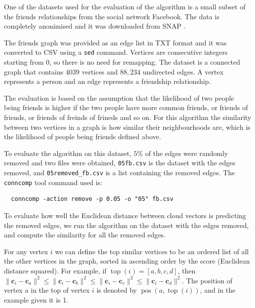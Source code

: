 \documentclass[12pt]{report}
\DeclareMathOperator{\ttop}{top}
\DeclareMathOperator{\pos}{pos}
\begin{document}
One of the datasets used for the evaluation of the algorithm is a small subset
of the friends relationships from the social network Facebook. The data is
completely anonimised and it was downloaded from SNAP \cite{snapnets}.


The friends graph was provided as an edge list in TXT format and it was converted
to CSV using a {\tt sed} command. Vertices are consecutive integers starting
from 0, so there is no need for remapping. The dataset is a connected graph that
contains $4039$ vertices and $88,234$ undirected edges. A vertex represents a
person and an edge represents a friendship relationship.


The evaluation is based on the assumption that the likelihood of two people
being friends is higher if the two people have more common friends, or friends
of friends, or friends of freinds of frineds and so on. For this algorithm the
similarity between two vertices in a graph is how similar their neighbourhoods
are, which is the likelihood of people being friends defined above.


To evaluate the algorithm on this dataset, $5\%$ of the edges were randomly
removed and two files were obtained, {\tt 05fb.csv} is the dataset with the
edges removed, and {\tt 05removed\_fb.csv} is a list containing the removed
edges. The {\tt conncomp} tool command used is:
\begin{lstlisting}
  conncomp -action remove -p 0.05 -o "05" fb.csv
\end{lstlisting}


To evaluate how well the Euclidean distance between cloud vectors is predicting
the removed edges, we run the algorithm on the dataset with the edges removed,
and compute the similarity for all the removed edges.


For any vertex $i$ we can define the top similar vertices to be an ordered list
of all the other vertices in the graph, sorted in ascending order by the score
(Euclidean distance squared). For example, if $\ttop(i) = [a, b, c, d]$, then
$\|\bm{c}_i - \bm{c}_a\|^2 \leq \|\bm{c}_i - \bm{c}_b\|^2 \leq
\|\bm{c}_i - \bm{c}_c\|^2 \leq \|\bm{c}_i - \bm{c}_d\|^2$. The position of
vertex $a$ in the top of vertex $i$ is denoted by $\pos(a,\ttop(i))$, and in the
example given it is 1.
\end{document}

